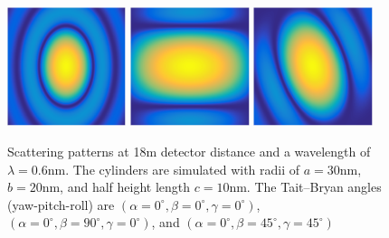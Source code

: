 \begin{figure}[htb] \includegraphics[width=0.31\textwidth]{../images/form_factor/supershapes/cylinder_0_0_0_18m.png}
\includegraphics[width=0.31\textwidth]{../images/form_factor/supershapes/cylinder_0_90_0_18m.png}   \includegraphics[width=0.31\textwidth]{../images/form_factor/supershapes/cylinder_0_45_45_18m.png}
\caption{Scattering patterns at 18m detector distance and a wavelength of $\lambda=0.6$nm. The cylinders are simulated with radii of $a=30$nm, $b=20$nm, and half height length $c=10$nm. The Tait–Bryan angles (yaw-pitch-roll) are $(\alpha=0^\circ,\beta=0^\circ,\gamma=0^\circ)$, $(\alpha=0^\circ,\beta=90^\circ,\gamma=0^\circ)$, and $(\alpha=0^\circ,\beta=45^\circ,\gamma=45^\circ)$ }
\label{fig:opo_cylinderIQ2D}
\end{figure}

